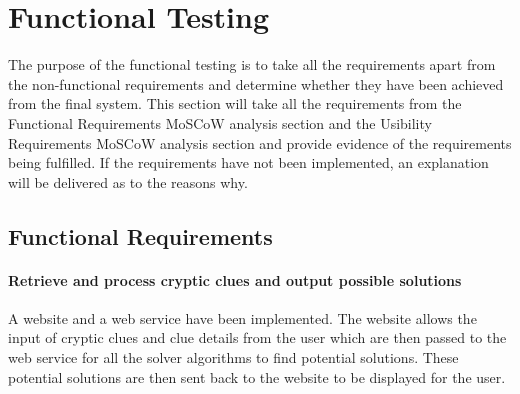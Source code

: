 \section{Functional Testing}
\label{sec:functional_testing}

The purpose of the functional testing is to take all the requirements apart from 
the non-functional requirements and determine whether they have been achieved 
from the final system. This section will take all the requirements from the Functional 
Requirements MoSCoW analysis section and the Usibility Requirements MoSCoW analysis 
section and provide evidence of the requirements being fulfilled. If the requirements have 
not been implemented, an explanation will be delivered as to the reasons why. 

\subsection{Functional Requirements}
\label{sub:test_func_func}

\paragraph{Retrieve and process cryptic clues and output possible
solutions}

A website and a web service have been implemented. The website allows the input
of cryptic clues and clue details from the user which are then passed to the web service 
for all the solver algorithms to find potential solutions. These potential solutions are then 
sent back to the website to be displayed for the user. 

